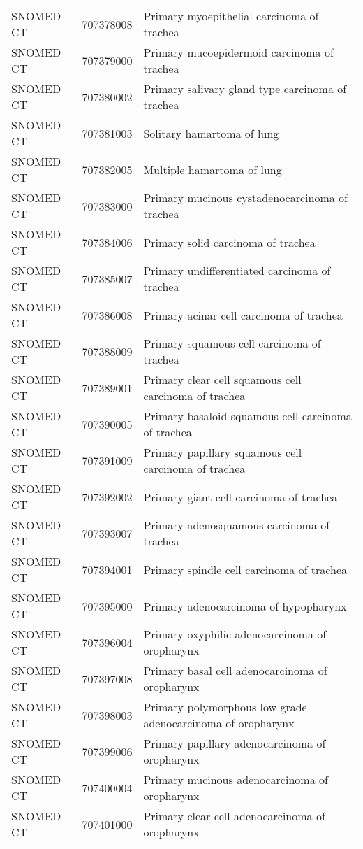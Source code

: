 \begin{longtable}{p{}p{}p{}}
  SNOMED CT & 707378008 & Primary myoepithelial carcinoma of trachea \\ 
  SNOMED CT & 707379000 & Primary mucoepidermoid carcinoma of trachea \\ 
  SNOMED CT & 707380002 & Primary salivary gland type carcinoma of trachea \\ 
  SNOMED CT & 707381003 & Solitary hamartoma of lung \\ 
  SNOMED CT & 707382005 & Multiple hamartoma of lung \\ 
  SNOMED CT & 707383000 & Primary mucinous cystadenocarcinoma of trachea \\ 
  SNOMED CT & 707384006 & Primary solid carcinoma of trachea \\ 
  SNOMED CT & 707385007 & Primary undifferentiated carcinoma of trachea \\ 
  SNOMED CT & 707386008 & Primary acinar cell carcinoma of trachea \\ 
  SNOMED CT & 707388009 & Primary squamous cell carcinoma of trachea \\ 
  SNOMED CT & 707389001 & Primary clear cell squamous cell carcinoma of trachea \\ 
  SNOMED CT & 707390005 & Primary basaloid squamous cell carcinoma of trachea \\ 
  SNOMED CT & 707391009 & Primary papillary squamous cell carcinoma of trachea \\ 
  SNOMED CT & 707392002 & Primary giant cell carcinoma of trachea \\ 
  SNOMED CT & 707393007 & Primary adenosquamous carcinoma of trachea \\ 
  SNOMED CT & 707394001 & Primary spindle cell carcinoma of trachea \\ 
  SNOMED CT & 707395000 & Primary adenocarcinoma of hypopharynx \\ 
  SNOMED CT & 707396004 & Primary oxyphilic adenocarcinoma of oropharynx \\ 
  SNOMED CT & 707397008 & Primary basal cell adenocarcinoma of oropharynx \\ 
  SNOMED CT & 707398003 & Primary polymorphous low grade adenocarcinoma of oropharynx \\ 
  SNOMED CT & 707399006 & Primary papillary adenocarcinoma of oropharynx \\ 
  SNOMED CT & 707400004 & Primary mucinous adenocarcinoma of oropharynx \\ 
  SNOMED CT & 707401000 & Primary clear cell adenocarcinoma of oropharynx \\ 

\end{longtable}
